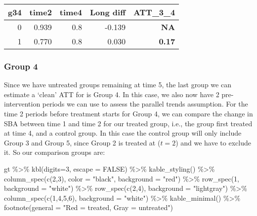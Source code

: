 \documentclass[
]{article}
\newenvironment{Shaded}{\begin{snugshade}}{\end{snugshade}}
\newcommand{\AttributeTok}[1]{\textcolor[rgb]{0.77,0.63,0.00}{#1}}
\newcommand{\ConstantTok}[1]{\textcolor[rgb]{0.00,0.00,0.00}{#1}}
\newcommand{\DecValTok}[1]{\textcolor[rgb]{0.00,0.00,0.81}{#1}}
\newcommand{\FunctionTok}[1]{\textcolor[rgb]{0.00,0.00,0.00}{#1}}
\newcommand{\NormalTok}[1]{#1}
\newcommand{\SpecialCharTok}[1]{\textcolor[rgb]{0.00,0.00,0.00}{#1}}
\newcommand{\StringTok}[1]{\textcolor[rgb]{0.31,0.60,0.02}{#1}}
\begin{document}
\begin{table}
\centering
\begin{tabular}{r|r|r|r|>{}r}
\hline
g34 & time2 & time4 & Long diff & ATT\_3\_4\\
\hline
0 & 0.939 & 0.8 & -0.139 & \textbf{NA}\\
\hline
1 & 0.770 & 0.8 & 0.030 & \textbf{0.17}\\
\hline
\end{tabular}
\end{table}

\hypertarget{group-4}{%
\subsubsection{Group 4}\label{group-4}}

Since we have untreated groups remaining at time 5, the last group we
can estimate a `clean' ATT for is Group 4. In this case, we also now
have 2 pre-intervention periods we can use to assess the parallel trends
assumption. For the time 2 periods before treatment starts for Group 4,
we can compare the change in SBA between time 1 and time 2 for our
treated group, i.e., the group first treated at time 4, and a control
group. In this case the control group will only include Group 3 and
Group 5, since Group 2 is treated at (\(t=2\)) and we have to exclude
it. So our comparison groups are:

\begin{Shaded}
\begin{Highlighting}[]
\NormalTok{gt }\SpecialCharTok{\%\textgreater{}\%}
  \FunctionTok{kbl}\NormalTok{(}\AttributeTok{digits=}\DecValTok{3}\NormalTok{, }\AttributeTok{escape =} \ConstantTok{FALSE}\NormalTok{) }\SpecialCharTok{\%\textgreater{}\%}
  \FunctionTok{kable\_styling}\NormalTok{() }\SpecialCharTok{\%\textgreater{}\%}
  \FunctionTok{column\_spec}\NormalTok{(}\FunctionTok{c}\NormalTok{(}\DecValTok{2}\NormalTok{,}\DecValTok{3}\NormalTok{), }\AttributeTok{color =} \StringTok{"black"}\NormalTok{, }\AttributeTok{background =} \StringTok{"red"}\NormalTok{) }\SpecialCharTok{\%\textgreater{}\%}
  \FunctionTok{row\_spec}\NormalTok{(}\DecValTok{1}\NormalTok{, }\AttributeTok{background =} \StringTok{"white"}\NormalTok{) }\SpecialCharTok{\%\textgreater{}\%}
  \FunctionTok{row\_spec}\NormalTok{(}\FunctionTok{c}\NormalTok{(}\DecValTok{2}\NormalTok{,}\DecValTok{4}\NormalTok{), }\AttributeTok{background =} \StringTok{"lightgray"}\NormalTok{) }\SpecialCharTok{\%\textgreater{}\%}
  \FunctionTok{column\_spec}\NormalTok{(}\FunctionTok{c}\NormalTok{(}\DecValTok{1}\NormalTok{,}\DecValTok{4}\NormalTok{,}\DecValTok{5}\NormalTok{,}\DecValTok{6}\NormalTok{), }\AttributeTok{background =} \StringTok{"white"}\NormalTok{) }\SpecialCharTok{\%\textgreater{}\%}
  \FunctionTok{kable\_minimal}\NormalTok{() }\SpecialCharTok{\%\textgreater{}\%}
  \FunctionTok{footnote}\NormalTok{(}\AttributeTok{general =} \StringTok{"Red = treated, Gray = untreated"}\NormalTok{)}
\end{Highlighting}
\end{Shaded}
\end{document}
